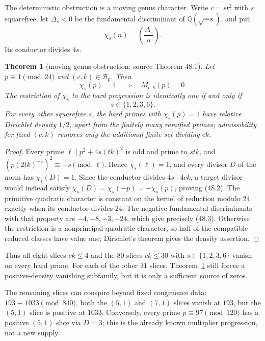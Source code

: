 \documentclass[10pt,reqno]{amsart}
\newtheorem{theorem}{Theorem}[section]
\theoremstyle{definition}
\newcommand{\1}{\mathbf 1}
\begin{document}
The deterministic obstruction is a moving genus character.  Write
$c=st^2$ with $s$ squarefree, let $\Delta_s<0$ be the fundamental
discriminant of $\mathbb Q(\sqrt{-s})$, and put
\begin{equation}\tag{48.1}
                         \chi_s(n)=\left(\frac{\Delta_s}{n}\right).
\end{equation}
Its conductor divides $4s$.
\begin{theorem}[moving genus obstruction; source Theorem 48.1]
\label{thm:moving-genus}
Let $p\equiv1\pmod {24}$ and $(c,k)\in\mathcal B_p$.  Then
\begin{equation}\tag{48.2}
                  \chi_s(p)=1\quad\Longrightarrow\quad M_{c,k}(p)=0.
\end{equation}
The restriction of $\chi_s$ to the hard progression is identically one if
and only if
\begin{equation}\tag{48.3}
                         s\in\{1,2,3,6\}.
\end{equation}
For every other squarefree $s$, the hard primes with $\chi_s(p)=1$ have
relative Dirichlet density $1/2$, apart from the finitely many ramified
primes; admissibility for fixed $(c,k)$ removes only the additional finite
set dividing $ck$.
\end{theorem}
\begin{proof}
Every prime $\ell\mid p^2+4s(tk)^2$ is odd and prime to $stk$, and
$(p(2tk)^{-1})^2\equiv-s\pmod\ell$.  Hence $\chi_s(\ell)=1$, and every
divisor $D$ of the norm has $\chi_s(D)=1$.  Since the conductor divides
$4s\mid4ck$, a target divisor would instead satisfy
$\chi_s(D)=\chi_s(-p)=-\chi_s(p)$, proving (48.2).  The primitive
quadratic character is constant on the kernel of reduction modulo $24$
exactly when its conductor divides $24$.  The negative fundamental
discriminants with that property are $-4,-8,-3,-24$, which give precisely
(48.3).  Otherwise the restriction is a nonprincipal quadratic character,
so half of the compatible reduced classes have value one; Dirichlet's
theorem gives the density assertion.
\end{proof}
Thus all eight slices $ck\leq4$ and the $80$ slices $ck\leq30$ with
$s\in\{1,2,3,6\}$ vanish on every hard prime.  For each of the other $31$
slices, Theorem~\ref{thm:moving-genus} still forces a positive-density
vanishing subfamily, but it is only a sufficient source of zeros.

The remaining slices can conspire beyond fixed congruence data:
$193\equiv1033\pmod{840}$, both the $(5,1)$ and $(7,1)$ slices vanish at
$193$, but the $(5,1)$ slice is positive at $1033$.  Conversely, every
prime $p\equiv97\pmod{120}$ has a positive $(5,1)$ slice via $D=3$; this is
the already known multiplier progression, not a new supply.
\end{document}
